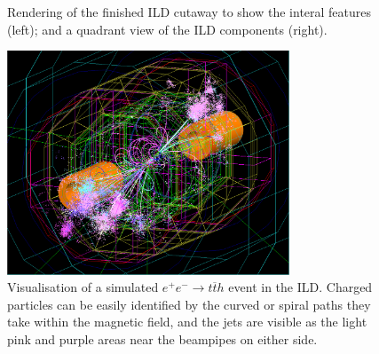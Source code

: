 \begin{figure}[h]%
	\centering
    \qquad
    \caption{Rendering of the finished \acrshort{ILD} cutaway to show the interal features (left); and a quadrant view of the \acrshort{ILD} components (right).}%
    \label{figure:colliders/ILD/double}%
\end{figure}

\begin{figure}[h]
	\centering
	\includegraphics[width=0.75\textwidth]{../Pictures/SimulatedEvent1.png}
	\caption{Visualisation of a simulated $e^+ e^- \rightarrow t \overline{t} h$ event in the \acrshort{ILD}. Charged particles can be easily identified by the curved or spiral paths they take within the magnetic field, and the jets are visible as the light pink and purple areas near the beampipes on either side.}
	\label{figure:colliders/ILD/tth-simulation}
\end{figure}

